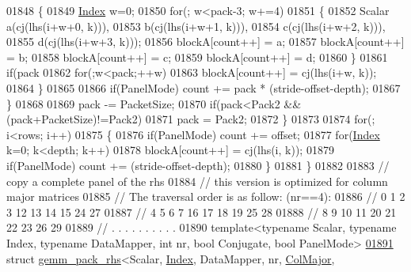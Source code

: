 \begin{DoxyCode}
01848       \{
01849         \hyperlink{namespace_eigen_a62e77e0933482dafde8fe197d9a2cfde}{Index} w=0;
01850         \textcolor{keywordflow}{for}(; w<pack-3; w+=4)
01851         \{
01852           Scalar a(cj(lhs(i+w+0, k))),
01853                  b(cj(lhs(i+w+1, k))),
01854                  c(cj(lhs(i+w+2, k))),
01855                  d(cj(lhs(i+w+3, k)));
01856           blockA[count++] = a;
01857           blockA[count++] = b;
01858           blockA[count++] = c;
01859           blockA[count++] = d;
01860         \}
01861         \textcolor{keywordflow}{if}(pack%
01862           \textcolor{keywordflow}{for}(;w<pack;++w)
01863             blockA[count++] = cj(lhs(i+w, k));
01864       \}
01865 
01866       \textcolor{keywordflow}{if}(PanelMode) count += pack * (stride-offset-depth);
01867     \}
01868 
01869     pack -= PacketSize;
01870     \textcolor{keywordflow}{if}(pack<Pack2 && (pack+PacketSize)!=Pack2)
01871       pack = Pack2;
01872   \}
01873 
01874   \textcolor{keywordflow}{for}(; i<rows; i++)
01875   \{
01876     \textcolor{keywordflow}{if}(PanelMode) count += offset;
01877     \textcolor{keywordflow}{for}(\hyperlink{namespace_eigen_a62e77e0933482dafde8fe197d9a2cfde}{Index} k=0; k<depth; k++)
01878       blockA[count++] = cj(lhs(i, k));
01879     \textcolor{keywordflow}{if}(PanelMode) count += (stride-offset-depth);
01880   \}
01881 \}
01882 
01883 \textcolor{comment}{// copy a complete panel of the rhs}
01884 \textcolor{comment}{// this version is optimized for column major matrices}
01885 \textcolor{comment}{// The traversal order is as follow: (nr==4):}
01886 \textcolor{comment}{//  0  1  2  3   12 13 14 15   24 27}
01887 \textcolor{comment}{//  4  5  6  7   16 17 18 19   25 28}
01888 \textcolor{comment}{//  8  9 10 11   20 21 22 23   26 29}
01889 \textcolor{comment}{//  .  .  .  .    .  .  .  .    .  .}
01890 \textcolor{keyword}{template}<\textcolor{keyword}{typename} Scalar, \textcolor{keyword}{typename} Index, \textcolor{keyword}{typename} DataMapper, \textcolor{keywordtype}{int} nr, \textcolor{keywordtype}{bool} Conjugate, \textcolor{keywordtype}{bool} PanelMode>
\hyperlink{struct_eigen_1_1internal_1_1gemm__pack__rhs_3_01_scalar_00_01_index_00_01_data_mapper_00_01nr_00e5afdbaca90e394aa6e3c7b4d02529b6}{01891} \textcolor{keyword}{struct }\hyperlink{struct_eigen_1_1internal_1_1gemm__pack__rhs}{gemm\_pack\_rhs}<Scalar, \hyperlink{namespace_eigen_a62e77e0933482dafde8fe197d9a2cfde}{Index}, DataMapper, nr, \hyperlink{group__enums_ggaacded1a18ae58b0f554751f6cdf9eb13a0cbd4bdd0abcfc0224c5fcb5e4f6669a}{ColMajor}, 

\end{DoxyCode}
